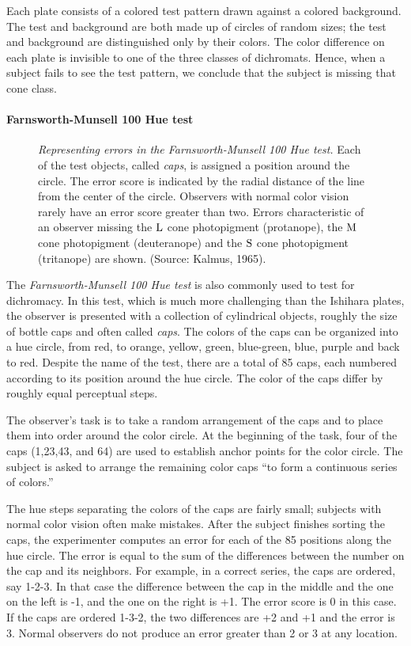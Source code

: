 Each plate consists of a colored test
pattern drawn against a colored background.
The test and background are both made up of circles
of random sizes;
the test and background are distinguished
only by their colors.
The color difference on each plate is
invisible to one of the three classes of dichromats.
Hence, when a subject fails to see the test pattern, 
we conclude that the subject is missing
that cone class.

\paragraph{Farnsworth-Munsell 100 Hue test}
\begin{figure}
\centerline{
}
\caption[Farnsworth Error Plot]{
{\em Representing errors in the Farnsworth-Munsell 100 Hue test.}
Each of the test objects, called {\em caps},
is assigned a position around the circle.
The error score is indicated by the radial distance of the
line from the center of the circle.
Observers with normal color vision rarely have an error
score greater than two.
Errors characteristic of an observer missing the $\mbox{L}$ cone photopigment
(protanope), the $\mbox{M}$ cone photopigment
(deuteranope) and the $\mbox{S}$ cone photopigment
(tritanope) are shown.  (Source:  Kalmus, 1965).
}
\label{f8:farnsworth}
\end{figure}
The {\em Farnsworth-Munsell 100 Hue test} is also
commonly used to test for dichromacy.
In this test, which is much more challenging than the Ishihara plates,
the observer is presented with a collection of
cylindrical objects, roughly the size of bottle caps
and often called {\em caps}.
The colors of the caps can be organized into a hue circle,
from red, to orange, yellow, green, blue-green, blue, purple and back to red.
Despite the name of the test,
there are a total of 85 caps, each numbered
according to its position around the hue circle.
The color of the caps differ by roughly equal perceptual steps.

The observer's task is to take a random
arrangement of the caps and to place
them into order around the color circle.
At the beginning of the task,
four of the caps (1,23,43, and 64) are used to establish
anchor points for the color circle.
The subject is asked to arrange the remaining
color caps ``to form a  continuous series of colors.''

The hue steps separating the colors of the
caps are fairly small;
subjects with normal color vision often make mistakes.
After the subject finishes sorting the caps, the experimenter
computes an error for each of the 85 positions along the hue circle.
The error is equal to
the sum of the differences
between the number on the cap and its neighbors.
For example, in a correct series, the caps are ordered, say 1-2-3.
In that case the difference between the cap
in the middle and the one on the left is -1,
and the one on the right is +1. 
The error score is 0 in this case.
If the caps are ordered 1-3-2,
the two differences are +2 and +1 and the error is 3.
Normal observers do not produce an error greater than 2
or 3 at any location.


